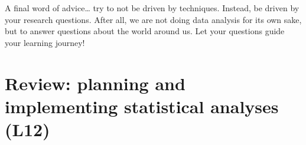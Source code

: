 \documentclass[
  letterpaper,
  8pt,
  a4paper]{book}
\begin{document}
A final word of advice\ldots{} try to not be driven by techniques.
Instead, be driven by your research questions. After all, we are not
doing data analysis for its own sake, but to answer questions about the
world around us. Let your questions guide your learning journey!


\chapter*{Review: planning and implementing statistical analyses
(L12)}\label{review-planning-and-implementing-statistical-analyses-l12}

\end{document}
